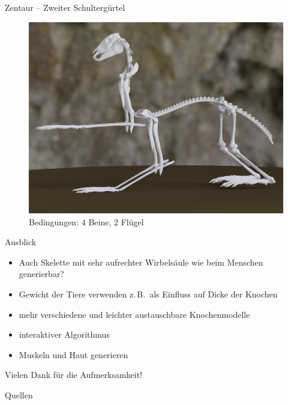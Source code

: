 \documentclass{beamer}
\newcommand{\zb}{z.\,B.\ }
\begin{document}
\begin{frame}{Zentaur -- Zweiter Schultergürtel}
 \begin{figure}
  \centering
  \includegraphics[height=0.75\textheight]{../../java_skeleton_generation/example_skeletons/zentaur2.jpg}
  \caption{Bedingungen: $4$ Beine, $2$ Flügel}
 \end{figure}
\end{frame}

\begin{frame}{Ausblick}
 \begin{itemize}
  \item Auch Skelette mit sehr aufrechter Wirbelsäule wie beim Menschen generierbar?
  \item Gewicht der Tiere verwenden \zb als Einfluss auf Dicke der Knochen
  \item mehr verschiedene und leichter austauschbare Knochenmodelle
  \item interaktiver Algorithmus
  \item Muskeln und Haut generieren
 \end{itemize}
\end{frame}


\begin{frame}[focus]
 Vielen Dank für die Aufmerksamkeit!
\end{frame}

\appendix
\begin{frame}[shrink=5]{Quellen}
 \printbibliography[heading=bibintoc]
\end{frame}
\end{document}
